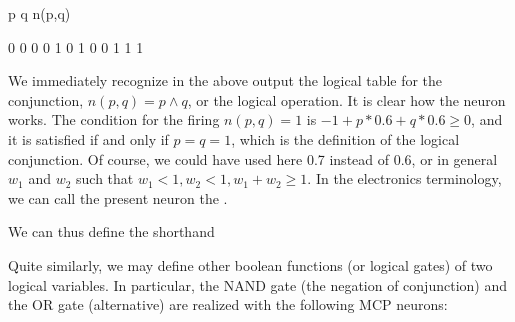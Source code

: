 \documentclass[letterpaper,10pt,english]{jupyterBook}
\begin{document}
\begin{sphinxVerbatim}[commandchars=\\\{\}]
p q n(p,q)

0 0  0
0 1  0
1 0  0
1 1  1
\end{sphinxVerbatim}

\sphinxAtStartPar
We immediately recognize in the above output the logical table for the conjunction, \(n(p,q)=p \land q\), or the logical  operation. It is clear how the neuron works. The condition for the firing \(n(p,q)=1\) is \(-1+p*0.6+q*0.6 \ge 0\), and it is satisfied if and only if \(p=q=1\), which is the definition of the logical conjunction. Of course, we could have used here 0.7 instead of 0.6, or in general \(w_1\) and \(w_2\) such that \(w_1<1, w_2<1, w_1+w_2 \ge 1\). In the electronics terminology, we can call the present neuron the .

\sphinxAtStartPar
We can thus define the short\sphinxhyphen{}hand

\begin{sphinxVerbatim}[commandchars=\\\{\}]
   \PYG{p}{[}\PYG{p}{]}\PYG{p}{[}\PYG{p}{]}
\end{sphinxVerbatim}

\sphinxAtStartPar
Quite similarly, we may define other boolean functions (or logical gates) of two logical variables. In particular, the NAND gate (the negation of conjunction) and the OR gate (alternative) are realized with the following MCP neurons:

\begin{sphinxVerbatim}[commandchars=\\\{\}]
   \PYG{p}{[}\PYG{p}{]}\PYG{p}{[}\PYG{p}{]}
     \PYG{p}{[}\PYG{p}{]}\PYG{p}{[}\PYG{p}{]}
\end{sphinxVerbatim}
\end{document}
